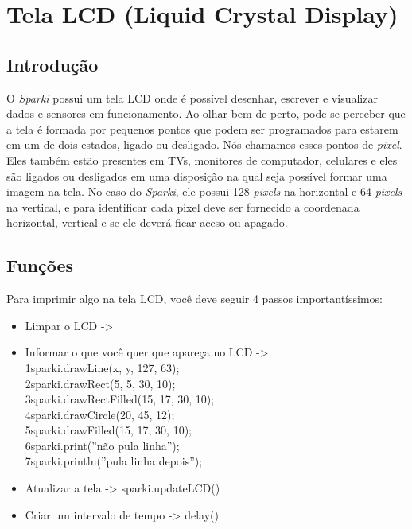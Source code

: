 \documentclass[conference]{IEEEtran}
\begin{document}
\section{\textbf{Tela LCD (Liquid Crystal Display)}}
\begin{center}
    \subsection{Introdução}    
\end{center}
    \par
    O \textit{Sparki} possui um tela LCD onde é possível desenhar, escrever e visualizar dados e sensores em funcionamento. Ao olhar bem de perto, pode-se perceber que a tela é formada por pequenos pontos que podem ser programados para estarem em um de dois estados, ligado ou desligado. Nós chamamos esses pontos de \textit{pixel}. Eles também estão presentes em TVs, monitores de computador, celulares e eles são ligados ou desligados em uma disposição na qual seja possível formar uma imagem na tela. No caso do \textit{Sparki}, ele possui 128 \textit{pixels} na horizontal e 64 \textit{pixels} na vertical, e para identificar cada pixel deve ser fornecido a coordenada horizontal, vertical e se ele deverá ficar aceso ou apagado.
\begin{center}
       \subsection{Funções}
\end{center}
    \par
    Para imprimir algo na tela LCD, você deve seguir 4 passos importantíssimos:
    \begin{itemize}
        \item Limpar o LCD -> { }
        \item Informar o que você quer que apareça no LCD -> \\
        {\selectfont
        {\color{cinza}1}\quad sparki.drawLine(x, y, 127, 63);\\
        {\color{cinza}2}\quad sparki.drawRect(5, 5, 30, 10);\\
        {\color{cinza}3}\quad sparki.drawRectFilled(15, 17, 30, 10);\\
        {\color{cinza}4}\quad sparki.drawCircle(20, 45, 12);\\
        {\color{cinza}5}\quad sparki.drawFilled(15, 17, 30, 10);\\
        {\color{cinza}6}\quad sparki.print({\color{verde}''não pula linha''});\\
        {\color{cinza}7}\quad sparki.println({\color{verde}''pula linha depois''});
        }
        \item Atualizar a tela -> {\selectfont sparki.updateLCD()}
        \item Criar um intervalo de tempo -> {\selectfont delay()}
    \end{itemize}
\end{document}

